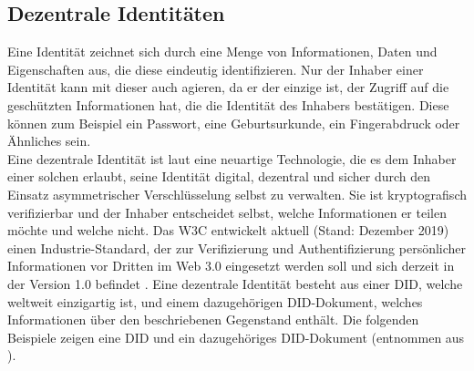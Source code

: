 
\subsection{Dezentrale Identitäten}
\label{subsec:fundamentals:dlt:did}
Eine Identität zeichnet sich durch eine Menge von Informationen, Daten und Eigenschaften aus, die diese eindeutig identifizieren. Nur der Inhaber einer Identität kann mit dieser auch agieren, da er der einzige ist, der Zugriff auf die geschützten Informationen hat, die die Identität des Inhabers bestätigen. Diese können zum Beispiel ein Passwort, eine Geburtsurkunde, ein Fingerabdruck oder Ähnliches sein.\\
Eine dezentrale Identität ist laut \cite{DID2007} eine neuartige Technologie, die es dem Inhaber einer solchen erlaubt, seine Identität digital, dezentral und sicher durch den Einsatz asymmetrischer Verschlüsselung selbst zu verwalten. Sie ist kryptografisch verifizierbar und der Inhaber entscheidet selbst, welche Informationen er teilen möchte und welche nicht. Das \ac{W3C} entwickelt aktuell (Stand: Dezember 2019) einen Industrie-Standard, der zur Verifizierung und Authentifizierung persönlicher Informationen vor Dritten im Web 3.0 eingesetzt werden soll und sich derzeit in der Version 1.0 befindet \cite{did2019}. Eine dezentrale Identität besteht aus einer \ac{DID}, welche weltweit einzigartig ist, und einem dazugehörigen DID-Dokument, welches Informationen über den beschriebenen Gegenstand enthält. Die folgenden Beispiele zeigen eine \ac{DID} und ein dazugehöriges DID-Dokument (entnommen aus \cite{did2019}).

